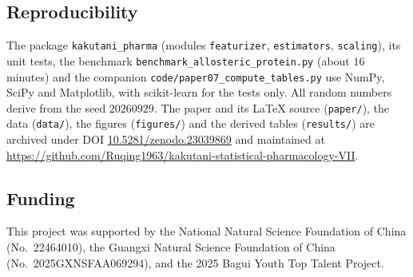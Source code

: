 \documentclass[11pt,reqno]{amsart}
\theoremstyle{plain}
\theoremstyle{definition}
\theoremstyle{remark}
\numberwithin{equation}{section}
\begin{document}
\subsection*{Reproducibility}
{\raggedright
The package \texttt{kakutani\_pharma} (modules \texttt{featurizer}, \texttt{estimators}, \texttt{scaling}), its unit tests, the benchmark \texttt{benchmark\_allosteric\_protein.py} (about $16$ minutes) and the companion \texttt{code/paper07\_compute\_tables.py} use NumPy, SciPy and Matplotlib, with scikit-learn for the tests only. All random numbers derive from the seed $20260929$. The paper and its \LaTeX{} source (\texttt{paper/}), the data (\texttt{data/}), the figures (\texttt{figures/}) and the derived tables (\texttt{results/}) are archived under DOI \href{https://doi.org/10.5281/zenodo.23039869}{10.5281/zenodo.23039869} and maintained at \url{https://github.com/Ruqing1963/kakutani-statistical-pharmacology-VII}.\par}

\subsection*{Funding}
This project was supported by the National Natural Science Foundation of China (No.~22464010), the Guangxi Natural Science Foundation of China (No.~2025GXNSFAA069294), and the 2025 Bagui Youth Top Talent Project.
\end{document}
